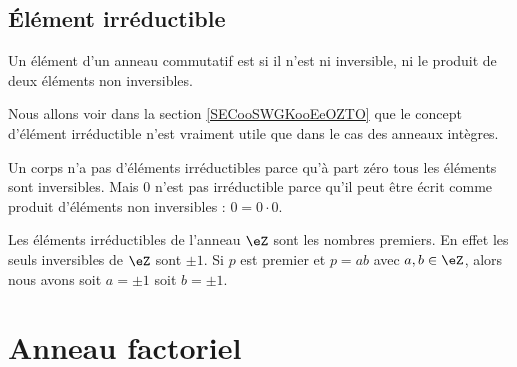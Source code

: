\subsection{Élément irréductible}

\begin{definition}  \label{DeirredBDhQfA}
    Un élément d'un anneau commutatif est  si il n'est ni inversible, ni le produit de deux éléments non inversibles.
\end{definition}

\begin{normaltext}
    Nous allons voir dans la section \ref{SECooSWGKooEeOZTO} que le concept d'élément irréductible n'est vraiment utile que dans le cas des anneaux intègres.
\end{normaltext}

\begin{example}
    Un corps n'a pas d'éléments irréductibles parce qu'à part zéro tous les éléments sont inversibles. Mais \( 0\) n'est pas irréductible parce qu'il peut être écrit comme produit d'éléments non inversibles : \( 0=0\cdot 0\).
\end{example}

\begin{example}
    Les éléments irréductibles de l'anneau \( \eZ\) sont les nombres premiers. En effet les seuls inversibles de \( \eZ\) sont \( \pm 1\). Si \( p\) est premier et \( p=ab\) avec \( a,b\in \eZ\), alors nous avons soit \( a=\pm 1\) soit \( b=\pm 1\).
\end{example}

\section{Anneau factoriel}

